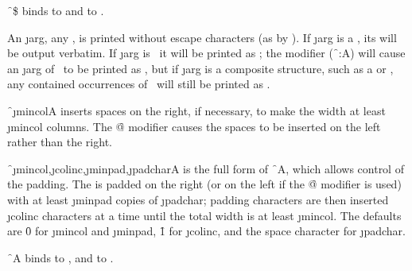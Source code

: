 \f{~\$} binds  to 
 and  to .


\endsubsubsection%

\endsubsection%





An \j{arg}, any , 
is printed without escape characters
(as by ).  If \j{arg} is a , 
its 
will be output verbatim.
If \j{arg} is \nil\ it will be printed as \nil;
the  modifier (\f{~:A}) will cause an \j{arg} of \nil\ to be printed as \empty,
but if \j{arg} is a composite structure, such as a  or ,
any contained occurrences of \nil\ will still be printed as \nil.

\f{~\j{mincol}A} inserts spaces on the right, if necessary, to make the
width at least \j{mincol} columns.  The \f{@}
modifier causes the spaces
to be inserted on the left rather than the right.

\f{~\j{mincol},\j{colinc},\j{minpad},\j{padchar}A} 
is the full form of \f{~A},
which allows control of the padding.
The  is padded on the right (or on the left if the
\f{@} modifier is used) with at least \j{minpad} copies
of \j{padchar}; padding characters are then inserted \j{colinc} characters
at a time until the total width is at least \j{mincol}.
The defaults are \f{0} for \j{mincol} and \j{minpad}, \f{1} for \j{colinc},
and the space character for \j{padchar}.

\f{~A} binds  to ,
and  to .

\endsubsubsection%

